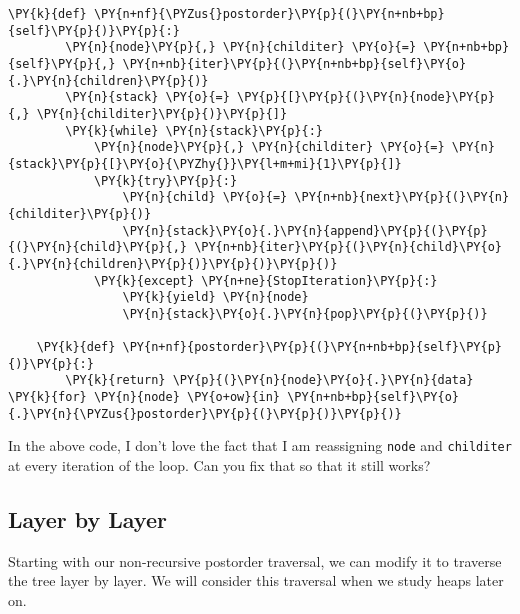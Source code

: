 \begin{Verbatim}[commandchars=\\\{\}]
    \PY{k}{def} \PY{n+nf}{\PYZus{}postorder}\PY{p}{(}\PY{n+nb+bp}{self}\PY{p}{)}\PY{p}{:}
        \PY{n}{node}\PY{p}{,} \PY{n}{childiter} \PY{o}{=} \PY{n+nb+bp}{self}\PY{p}{,} \PY{n+nb}{iter}\PY{p}{(}\PY{n+nb+bp}{self}\PY{o}{.}\PY{n}{children}\PY{p}{)}
        \PY{n}{stack} \PY{o}{=} \PY{p}{[}\PY{p}{(}\PY{n}{node}\PY{p}{,} \PY{n}{childiter}\PY{p}{)}\PY{p}{]}
        \PY{k}{while} \PY{n}{stack}\PY{p}{:}
            \PY{n}{node}\PY{p}{,} \PY{n}{childiter} \PY{o}{=} \PY{n}{stack}\PY{p}{[}\PY{o}{\PYZhy{}}\PY{l+m+mi}{1}\PY{p}{]}
            \PY{k}{try}\PY{p}{:}
                \PY{n}{child} \PY{o}{=} \PY{n+nb}{next}\PY{p}{(}\PY{n}{childiter}\PY{p}{)}
                \PY{n}{stack}\PY{o}{.}\PY{n}{append}\PY{p}{(}\PY{p}{(}\PY{n}{child}\PY{p}{,} \PY{n+nb}{iter}\PY{p}{(}\PY{n}{child}\PY{o}{.}\PY{n}{children}\PY{p}{)}\PY{p}{)}\PY{p}{)}
            \PY{k}{except} \PY{n+ne}{StopIteration}\PY{p}{:}
                \PY{k}{yield} \PY{n}{node}
                \PY{n}{stack}\PY{o}{.}\PY{n}{pop}\PY{p}{(}\PY{p}{)}                 

    \PY{k}{def} \PY{n+nf}{postorder}\PY{p}{(}\PY{n+nb+bp}{self}\PY{p}{)}\PY{p}{:}
        \PY{k}{return} \PY{p}{(}\PY{n}{node}\PY{o}{.}\PY{n}{data} \PY{k}{for} \PY{n}{node} \PY{o+ow}{in} \PY{n+nb+bp}{self}\PY{o}{.}\PY{n}{\PYZus{}postorder}\PY{p}{(}\PY{p}{)}\PY{p}{)}
\end{Verbatim}



In the above code, I don’t love the fact that I am reassigning \texttt{node} and \texttt{childiter} at every iteration of the loop.  Can you fix that so that it still works?

\subsection{Layer by Layer}


Starting with our non-recursive postorder traversal, we can modify it to traverse the tree layer by layer.
We will consider this traversal when we study heaps later on.

